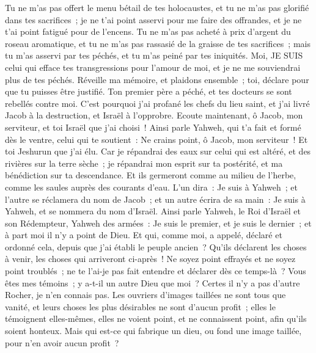 \begin{multicols}{2}
Tu ne m'as pas offert le menu bétail de tes holocaustes, et tu ne m'as pas glorifié dans tes sacrifices~; je ne t'ai point asservi pour me faire des offrandes, et je ne t'ai point fatigué pour de l'encens.
Tu ne m'as pas acheté à prix d'argent du roseau aromatique, et tu ne m'as pas rassasié de la graisse de tes sacrifices~; mais tu m'as asservi par tes péchés, et tu m'as peiné par tes iniquités.
Moi, JE SUIS celui qui efface tes transgressions pour l'amour de moi, et je ne me souviendrai plus de tes péchés.
Réveille ma mémoire, et plaidons ensemble~; toi, déclare pour que tu puisses être justifié.
Ton premier père a péché, et tes docteurs se sont rebellés contre moi.
C'est pourquoi j'ai profané les chefs du lieu saint, et j'ai livré Jacob à la destruction, et Israël à l'opprobre.
\VerseOne{}Ecoute maintenant, ô Jacob, mon serviteur, et toi Israël que j'ai choisi~!
Ainsi parle Yahweh, qui t'a fait et formé dès le ventre, celui qui te soutient~: Ne crains point, ô Jacob, mon serviteur~! Et toi Jeshurun que j'ai élu.
Car je répandrai des eaux sur celui qui est altéré, et des rivières sur la terre sèche~; je répandrai mon esprit sur ta postérité, et ma bénédiction sur ta descendance.
Et ils germeront comme au milieu de l'herbe, comme les saules auprès des courants d'eau.
L'un dira~: Je suis à Yahweh~; et l'autre se réclamera du nom de Jacob~; et un autre écrira de sa main~: Je suis à Yahweh, et se nommera du nom d'Israël.
Ainsi parle Yahweh, le Roi d'Israël et son Rédempteur, Yahweh des armées~: Je suis le premier, et je suis le dernier~; et à part moi il n'y a point de Dieu.
Et qui, comme moi, a appelé, déclaré et ordonné cela, depuis que j'ai établi le peuple ancien~? Qu'ils déclarent les choses à venir, les choses qui arriveront ci-après~!
Ne soyez point effrayés et ne soyez point troublés~; ne te l'ai-je pas fait entendre et déclarer dès ce temps-là~? Vous êtes mes témoins~; y a-t-il un autre Dieu que moi~? Certes il n'y a pas d'autre Rocher, je n'en connais pas.
Les ouvriers d'images taillées ne sont tous que vanité, et leurs choses les plus désirables ne sont d'aucun profit~; elles le témoignent elles-mêmes, elles ne voient point, et ne connaissent point, afin qu'ils soient honteux.
Mais qui est-ce qui fabrique un dieu, ou fond une image taillée, pour n'en avoir aucun profit~?

\end{multicols}
